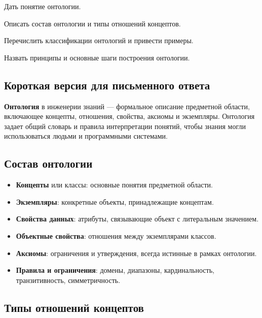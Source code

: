 
\begin{examplan}
    \item Дать понятие онтологии.
    \item Описать состав онтологии и типы отношений концептов.
    \item Перечислить классификации онтологий и привести примеры.
    \item Назвать принципы и основные шаги построения онтологии.
\end{examplan}

\subsection*{Короткая версия для письменного ответа}

\textbf{Онтология} в инженерии знаний --- формальное описание предметной области, включающее концепты, отношения, свойства, аксиомы и экземпляры. Онтология задает общий словарь и правила интерпретации понятий, чтобы знания могли использоваться людьми и программными системами.

\subsection*{Состав онтологии}

\begin{itemize}
    \item \textbf{Концепты} или классы: основные понятия предметной области.
    \item \textbf{Экземпляры}: конкретные объекты, принадлежащие концептам.
    \item \textbf{Свойства данных}: атрибуты, связывающие объект с литеральным значением.
    \item \textbf{Объектные свойства}: отношения между экземплярами классов.
    \item \textbf{Аксиомы}: ограничения и утверждения, всегда истинные в рамках онтологии.
    \item \textbf{Правила и ограничения}: домены, диапазоны, кардинальность, транзитивность, симметричность.
\end{itemize}

\subsection*{Типы отношений концептов}

